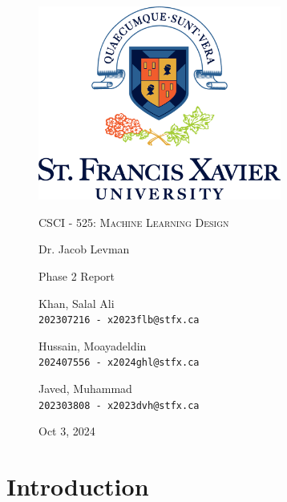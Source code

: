 \documentclass[a4paper,12pt]{article}
\begin{document}
\begin{titlepage}

\begin{figure}[H]
  \centering
  \includegraphics[width=8cm]{../stfx_logo.png}\par
  \vspace{1cm}
  {\scshape\Large CSCI - 525: Machine Learning Design \par}
  \vspace{0.5cm}
  {\large Dr. Jacob Levman \par}
  \vspace{1cm}
  {\Large Phase 2 Report \par}
  \vspace{1cm}
  {\large Khan, Salal Ali\\ \texttt{202307216 - x2023flb@stfx.ca} \par}
  \vspace{0.5cm}
  {\large Hussain, Moayadeldin\\ \texttt{202407556 - x2024ghl@stfx.ca} \par}
  \vspace{0.5cm}
  {\large Javed, Muhammad\\ \texttt{202303808 - x2023dvh@stfx.ca} \par}
  \vfill
  \vspace{0.5cm}
  {\large Oct 3, 2024 \par}
\end{figure}

\end{titlepage}

\section*{Introduction}
\end{document}
